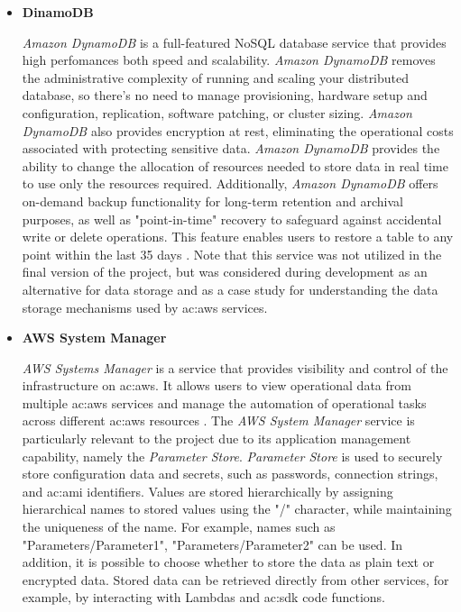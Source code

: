 \begin{itemize}
    \item[] \textbf{DinamoDB}
    
    \textit{Amazon DynamoDB} is a full-featured NoSQL database service that provides high perfomances both speed and scalability. \textit{Amazon DynamoDB} removes the administrative complexity of running and scaling your distributed database, so there's no need to manage provisioning, hardware setup and configuration, replication, software patching, or cluster sizing. \textit{Amazon DynamoDB} also provides encryption at rest, eliminating the operational costs associated with protecting sensitive data. \textit{Amazon DynamoDB} provides the ability to change the allocation of resources needed to store data in real time to use only the resources required. Additionally, \textit{Amazon DynamoDB} offers on-demand backup functionality for long-term retention and archival purposes, as well as "point-in-time" recovery to safeguard against accidental write or delete operations. This feature enables users to restore a table to any point within the last 35 days \cite{AWSDynamoDB}. Note that this service was not utilized in the final version of the project, but was considered during development as an alternative for data storage and as a case study for understanding the data storage mechanisms used by \gls{ac:aws} services.
    
    \item[] \textbf{AWS System Manager}
    
    \textit{AWS Systems Manager} is a service that provides visibility and control of the infrastructure on \gls{ac:aws}. It allows users to view operational data from multiple \gls{ac:aws} services and manage the automation of operational tasks across different \gls{ac:aws} resources \cite{AWSSM}. The \textit{AWS System Manager} service is particularly relevant to the project due to its application management capability, namely the \textit{Parameter Store}. \textit{Parameter Store} is used to securely store configuration data and secrets, such as passwords, connection strings, and \gls{ac:ami} identifiers. Values are stored hierarchically by assigning hierarchical names to stored values using the "/" character, while maintaining the uniqueness of the name. For example, names such as "Parameters/Parameter1", "Parameters/Parameter2" can be used. In addition, it is possible to choose whether to store the data as plain text or encrypted data. Stored data can be retrieved directly from other services, for example, by interacting with Lambdas and \gls{ac:sdk} code functions.
     

\end{itemize}
